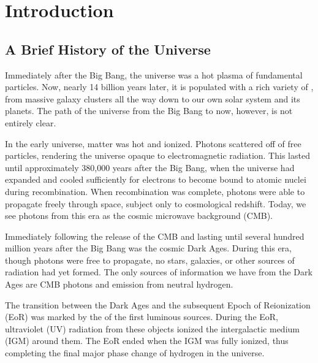\documentclass[12pt]{article}
\begin{document}
\clearpage
{}

\begingroup
\hypersetup{
	colorlinks=true,
	citecolor=DarkBlue,
	filecolor=black,
	linkcolor=black,
	urlcolor=DarkBlue
}
\tableofcontents
\listoffigures
\listoftables
\endgroup
\newpage

\begin{abstract}
\end{abstract}

\clearpage
{}

\section{Introduction} \label{sec:intro}

\subsection{A Brief History of the Universe} \label{subsec:universe}

Immediately after the Big Bang, the universe was a hot plasma of fundamental particles. Now, nearly 14 billion years later, it is populated with a rich variety of , from massive galaxy clusters all the way down to our own solar system and its planets. The  path of the universe from the Big Bang to now, however, is not entirely clear.

In the early universe, matter was hot and ionized. Photons scattered off of free particles, rendering the universe opaque to electromagnetic radiation. This lasted until approximately 380,000 years after the Big Bang, when the universe had expanded and cooled sufficiently for electrons to become bound to atomic nuclei during recombination. When recombination was complete, photons were able to propagate freely through space, subject only to cosmological redshift. Today, we see photons from this era as the cosmic microwave background (CMB).

Immediately following the release of the CMB and lasting until several hundred million years after the Big Bang was the cosmic Dark Ages. During this era, though photons were free to propagate, no stars, galaxies, or other sources of radiation had yet formed. The only sources of information we have from the Dark Ages are CMB photons and emission from neutral hydrogen.

The transition between the Dark Ages and the subsequent Epoch of Reionization (EoR) was marked by the  of the first luminous sources. During the EoR, ultraviolet (UV) radiation from these objects ionized the intergalactic medium (IGM) around them. The EoR ended when the IGM was fully ionized, thus completing the final major phase change of hydrogen in the universe.
\end{document}
